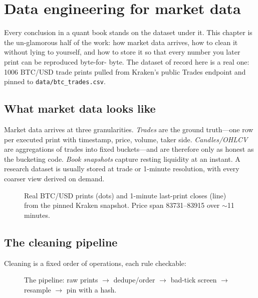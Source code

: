 \chapter{Data engineering for market data}\label{ch:data}

\noindent Every conclusion in a quant book stands on the dataset under it. This chapter is the
un-glamorous half of the work: how market data arrives, how to clean it without lying to
yourself, and how to store it so that every number you later print can be reproduced byte-for-
byte. The dataset of record here is a real one: 1006 BTC/USD trade prints pulled from
Kraken's public Trades endpoint and pinned to \texttt{data/btc\_trades.csv}.

\section{What market data looks like}\label{sec:marketdata}

Market data arrives at three granularities. \emph{Trades} are the ground truth---one row per
executed print with timestamp, price, volume, taker side. \emph{Candles/OHLCV} are
aggregations of trades into fixed buckets---and are therefore only as honest as the bucketing
code. \emph{Book snapshots} capture resting liquidity at an instant. A research dataset is
usually stored at trade or 1-minute resolution, with every coarser view derived on demand.

\begin{figure}[htbp]\centering

\caption{Real BTC/USD prints (dots) and 1-minute last-print closes (line) from the pinned
Kraken snapshot. Price span 83731--83915 over $\sim$11 minutes.}
\label{fig:prints}
\end{figure}

\section{The cleaning pipeline}\label{sec:clean}

Cleaning is a fixed order of operations, each rule checkable:

\begin{figure}[htbp]\centering

\caption{The pipeline: raw prints $\to$ dedupe/order $\to$ bad-tick screen $\to$ resample
$\to$ pin with a hash.}
\label{fig:pipeline}
\end{figure}

